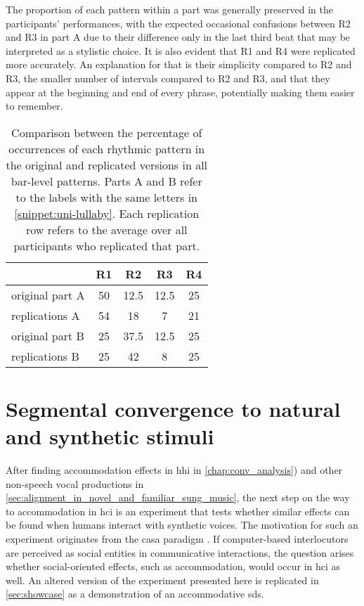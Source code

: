 The proportion of each pattern within a part was generally preserved in the participants' performances, with the expected occasional confusions between R2 and R3 in part A due to their difference only in the last third beat that may be interpreted as a stylistic choice.
It is also evident that R1 and R4 were replicated more accurately.
An explanation for that is their simplicity compared to R2 and R3, the smaller number of intervals compared to R2 and R3, and that they appear at the beginning and end of every phrase, potentially making them easier to remember.
%
\begin{table}[H]
	\caption[Percentages of rhythmic pattern replications]
		{Comparison between the percentage of occurrences of each rhythmic pattern in the original and replicated versions in all bar-level patterns.
		Parts A and B refer to the labels with the same letters in \cref{snippet:uni-lullaby}.
		Each replication row refers to the average over all participants who replicated that part.}
	\label{tab:neutral_rhythm_key}
	\centering
	\begin{tabularx}{\linewidth}{XSSSS}
		\toprule
						& \bfseries{R1}		& \bfseries{R2}		& \bfseries{R3}		& \bfseries{R4}\\
		\midrule
		original part A	& 50				& 12.5				& 12.5				& 25\\
		replications A	& 54				& 18				& 7					& 21\\
		\rule{0pt}{0.5cm}%
		original part B	& 25				& 37.5				& 12.5				& 25\\
		replications B	& 25				& 42				& 8					& 25\\		
		\bottomrule
	\end{tabularx}
\end{table}

\section{Segmental convergence to natural and synthetic stimuli}
\label{sec:convergence_to_natural_and_synthetic_stimuli}

After finding accommodation effects in \ac{hhi} in \cref{chap:conv_analysis}) and other non-speech vocal productions in \cref{sec:alignment_in_novel_and_familiar_sung_music}, the next step on the way to accommodation in \acf{hci} is an experiment that tests whether similar effects can be found when humans interact with synthetic voices.
The motivation for such an experiment originates from the \ac{casa} paradigm \citep[][and cf.\ \cref{subsec:verbal_interaction}]{Nass1994computers, Nass2000machines}.
If computer-based interlocutors are perceived as social entities in communicative interactions, the question arises whether social-oriented effects, such as accommodation, would occur in \ac{hci} as well.
An altered version of the experiment presented here is replicated in \cref{sec:showcase} as a demonstration of an accommodative \ac{sds}.


